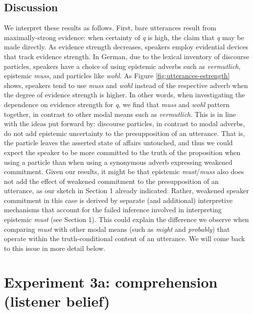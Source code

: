 \documentclass[11pt]{article}
\newcommand{\figref}[1]{Figure \ref{#1}}
\begin{document}
\subsection{Discussion}
We interpret these results as follows. First, bare utterances result from maximally-strong evidence: when certainty of \emph{q} is high, the claim that \emph{q} may be made directly. As evidence strength decreases, speakers employ evidential devices that track evidence strength. In German, due to the lexical inventory of discourse particles, speakers have a choice of using epistemic adverbs such as \emph{vermutlich}, epistemic \emph{muss}, and particles like \emph{wohl}. As \figref{fig:utterances-estrength} shows, speakers tend to use \emph{muss} and \emph{wohl} instead of the respective adverb when the degree of evidence strength is higher. In other words, when investigating the dependence on evidence strength for \emph{q}, we find that \emph{muss} and \emph{wohl} pattern together, in contrast to other modal means such as \emph{vermutlich}. This is in line with the ideas put forward by\cite{Zimmermann2004, Zimmermann2008}: discourse particles, in contrast to modal adverbs, do not add epistemic uncertainty to the presupposition of an utterance. That is, the particle leaves the asserted state of affairs untouched, and thus we could expect the speaker to be more committed to the truth of the proposition when using a particle than when using a synonymous adverb expressing weakened commitment. Given our results, it might be that epistemic \emph{must}/\emph{muss} also does not add the effect of weakened commitment to the presupposition of an utterance, as our sketch in Section 1 already indicated. Rather, weakened speaker commitment in this case is derived by separate (and additional) interpretive mechanisms that account for the failed inference involved in interpreting epistemic \emph{must} (see Section 1). This could explain the difference we observe when comparing \emph{must} with other modal means (such as \emph{might} and \emph{probably}) that operate within the truth-conditional content of an utterance. We will come back to this issue in more detail below.



\section{Experiment 3a: comprehension (listener belief)}
\end{document}
